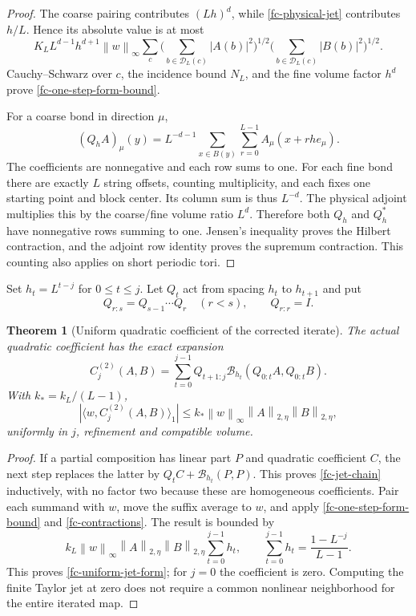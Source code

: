 \documentclass[11pt]{article}
\newtheorem{theorem}{Theorem}[section]
\theoremstyle{remark}
\newcommand{\norm}[1]{\left\|#1\right\|}
\begin{document}
\begin{proof}
The coarse pairing contributes $(Lh)^d$, while
\eqref{fc-physical-jet} contributes $h/L$. Hence its absolute value
is at most
\[
 K_LL^{d-1}h^{d+1}\norm{w}_\infty
 \sum_c
 \Big(\sum_{b\in\mathcal D_L(c)}|A(b)|^2\Big)^{1/2}
 \Big(\sum_{b\in\mathcal D_L(c)}|B(b)|^2\Big)^{1/2}.
\]
Cauchy--Schwarz over $c$, the incidence bound $N_L$, and the fine
volume factor $h^d$ prove \eqref{fc-one-step-form-bound}.

For a coarse bond in direction $\mu$,
\[
 (Q_h A)_\mu(y)=L^{-d-1}\sum_{x\in B(y)}\sum_{r=0}^{L-1}
                         A_\mu(x+rh e_\mu).
\]
The coefficients are nonnegative and each row sums to one. For
each fine bond there are exactly $L$ string offsets, counting
multiplicity, and each fixes one starting point and block center.
Its column sum is thus $L^{-d}$. The physical adjoint multiplies
this by the coarse/fine volume ratio $L^d$. Therefore both $Q_h$
and $Q_h^*$ have nonnegative rows summing to one. Jensen's
inequality proves the Hilbert contraction, and the adjoint row
identity proves the supremum contraction. This counting also
applies on short periodic tori.
\end{proof}

Set $h_t=L^{t-j}$ for $0\le t\le j$. Let $Q_t$ act from spacing
$h_t$ to $h_{t+1}$ and put
\[
 Q_{r:s}=Q_{s-1}\cdots Q_r\quad(r<s),\qquad Q_{r:r}=I.
\]

\begin{theorem}[Uniform quadratic coefficient of the corrected iterate]
\label{fc-iterated-jet-theorem}
The actual quadratic coefficient has the exact expansion
\begin{equation}
 C_j^{(2)}(A,B)=\sum_{t=0}^{j-1}Q_{t+1:j}
       \mathcal B_{h_t}(Q_{0:t}A,Q_{0:t}B).
 \label{fc-jet-chain}
\end{equation}
With $k_*=k_L/(L-1)$,
\begin{equation}
 |\langle w,C_j^{(2)}(A,B)\rangle_1|
 \le k_*\norm{w}_\infty\norm{A}_{2,\eta}\norm{B}_{2,\eta},
 \label{fc-uniform-jet-form}
\end{equation}
uniformly in $j$, refinement and compatible volume.
\end{theorem}

\begin{proof}
If a partial composition has linear part $P$ and quadratic
coefficient $C$, the next step replaces the latter by
$Q_tC+\mathcal B_{h_t}(P,P)$. This proves
\eqref{fc-jet-chain} inductively, with no factor two because these
are homogeneous coefficients. Pair each summand with $w$, move
the suffix average to $w$, and apply
\eqref{fc-one-step-form-bound} and \eqref{fc-contractions}.
The result is bounded by
\[
 k_L\norm{w}_\infty\norm{A}_{2,\eta}\norm{B}_{2,\eta}
       \sum_{t=0}^{j-1}h_t,
 \qquad
 \sum_{t=0}^{j-1}h_t=\frac{1-L^{-j}}{L-1}.
\]
This proves \eqref{fc-uniform-jet-form}; for $j=0$ the coefficient
is zero. Computing the finite Taylor jet at zero does not require
a common nonlinear neighborhood for the entire iterated map.
\end{proof}
\end{document}
